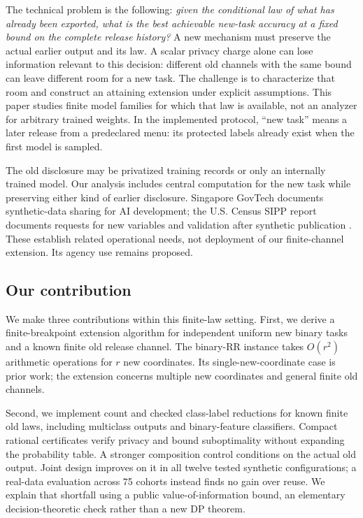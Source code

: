 \documentclass{article}
\begin{document}
The technical problem is the following: \emph{given the conditional law
of what has already been exported, what is the best achievable new-task
accuracy at a fixed bound on the complete release history?} A new mechanism
must preserve the actual earlier output and its law. A scalar privacy
charge alone can lose information relevant to this decision: different
old channels with the same bound can leave different room for a new task.
The challenge is to characterize that room and construct an attaining
extension under explicit assumptions. This paper studies finite model
families for which that law is available, not an analyzer for arbitrary
trained weights. In the implemented protocol, ``new task'' means a later
release from a predeclared menu: its protected labels already exist when
the first model is sampled.

The old disclosure may be privatized training records or only an
internally trained model. Our analysis includes central computation for
the new task while preserving either kind of earlier disclosure.
Singapore GovTech documents synthetic-data sharing for AI development;
the U.S. Census SIPP report documents requests for new variables and
validation after synthetic publication
\citep{govtech2026syntheticapplications,benedetto2013ssb}.
These establish related operational needs, not deployment of our
finite-channel extension. Its agency use remains proposed.


\subsection{Our contribution}
\label{sec:contribution}
We make three contributions within this finite-law setting.
First, we derive a finite-breakpoint extension algorithm for independent
uniform new binary tasks and a known finite old release channel. The
binary-RR instance takes $O(r^2)$ arithmetic operations for $r$ new
coordinates. Its single-new-coordinate case is prior work; the extension
concerns multiple new coordinates and general finite old channels.

Second, we implement count and checked class-label reductions for known
finite old laws, including multiclass outputs and binary-feature
classifiers. Compact rational certificates verify privacy and bound
suboptimality without expanding the probability table. A stronger
composition control conditions on the actual old output. Joint design
improves on it in all twelve tested synthetic configurations; a real-data
evaluation across 75 cohorts instead finds no gain over reuse. We explain
that shortfall using a public value-of-information bound, an elementary
decision-theoretic check rather than a new DP theorem.
\end{document}

